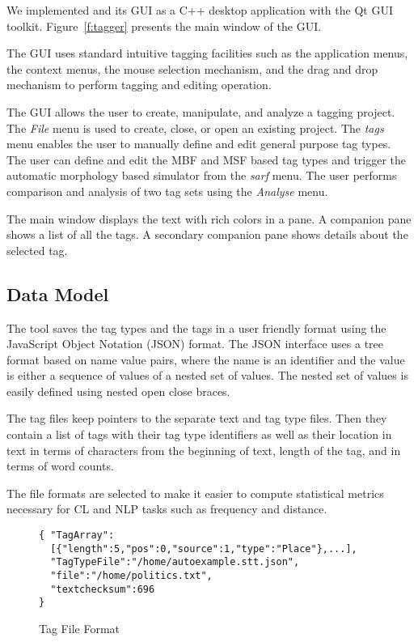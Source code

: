 We implemented \framework and its GUI as a C++ desktop application 
with the Qt GUI toolkit. 
Figure~\ref{f:tagger} presents the main window of the \framework GUI.

The \framework GUI uses standard intuitive tagging facilities such as 
the application menus, the context menus, the mouse selection mechanism,
and the drag and drop mechanism to perform tagging and editing operation. 

The \framework GUI allows the user to create, manipulate, and analyze a tagging project. 
The {\em File} menu is used to create, close, or open an existing project. 
The {\em tags} menu enables the user to manually define and edit general purpose tag types.
The user can define and edit the MBF and MSF based tag types and 
trigger the automatic morphology based simulator from the {\em sarf} menu. 
The user performs comparison and analysis of two tag sets 
using the {\em Analyse} menu. 

The main window displays the text with rich colors in a pane. 
A companion pane shows a list of all the tags. 
A secondary companion pane shows details about the selected tag.

\subsection{Data Model}

The \framework tool saves the tag types and the tags in a user friendly format using
the JavaScript Object Notation (JSON) format.
The JSON interface uses a tree format based on name value pairs, where the name 
is an identifier and the value is either a sequence of values of a nested set of values. 
The nested set of values is easily defined using nested open close braces. 

The tag files keep pointers to the separate text and tag type files. 
Then they contain a list of tags with their tag type identifiers as well as their location
in text in terms of characters from the beginning of text, length of the tag, 
and in terms of word counts.

The file formats are selected to make it easier to compute statistical metrics 
necessary for CL and NLP tasks such as frequency and distance. 


\begin{figure}[h*]
\begingroup
    \fontsize{8pt}{12pt}\selectfont
\begin{verbatim}
{ "TagArray":
  [{"length":5,"pos":0,"source":1,"type":"Place"},...],
  "TagTypeFile":"/home/autoexample.stt.json",
  "file":"/home/politics.txt",
  "textchecksum":696
}
\end{verbatim}
\endgroup
\caption{Tag File Format}
\label{fig:tagfile}
\end{figure}


